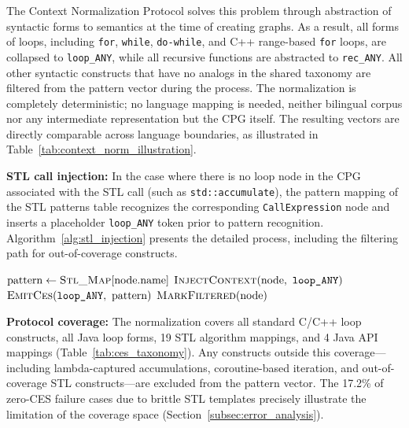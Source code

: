 The Context Normalization Protocol solves this problem through abstraction of syntactic forms to semantics at the time of creating graphs. As a result, all forms of loops, including \texttt{for}, \texttt{while}, \texttt{do-while}, and C++ range-based \texttt{for} loops, are collapsed to \texttt{loop\_ANY}, while all recursive functions are abstracted to \texttt{rec\_ANY}. All other syntactic constructs that have no analogs in the shared taxonomy are filtered from the pattern vector during the process. The normalization is completely deterministic; no language mapping is needed, neither bilingual corpus nor any intermediate representation but the CPG itself. The resulting vectors are directly comparable across language boundaries, as illustrated in Table~\ref{tab:context_norm_illustration}.

\textbf{STL call injection:} In the case where there is no loop node in the CPG associated with the STL call (such as \texttt{std::accumulate}), the pattern mapping of the STL patterns table recognizes the corresponding \texttt{CallExpression} node and inserts a placeholder \texttt{loop\_ANY} token prior to pattern recognition. Algorithm~\ref{alg:stl_injection} presents the detailed process, including the filtering path for out-of-coverage constructs.

\begin{algorithm}[t]
\caption{STL Call Injection Protocol}
\label{alg:stl_injection}
\begin{algorithmic}[1]
                \State $\text{pattern} \leftarrow \textsc{Stl\_Map}[\text{node.name}]$
                \State $\textsc{InjectContext}(\text{node},\ \texttt{loop\_ANY})$
                \State $\textsc{EmitCes}(\texttt{loop\_ANY},\ \text{pattern})$
            \Else
                \State $\textsc{MarkFiltered}(\text{node})$
            \EndIf
        \EndIf
    \EndFor
\end{algorithmic}
\end{algorithm}

\textbf{Protocol coverage:} The normalization covers all standard C/C++ loop constructs, all Java loop forms, 19 STL algorithm mappings, and 4 Java API mappings (Table~\ref{tab:ces_taxonomy}). Any constructs outside this coverage---including lambda-captured accumulations, coroutine-based iteration, and out-of-coverage STL constructs---are excluded from the pattern vector. The 17.2\% of zero-CES failure cases due to brittle STL templates precisely illustrate the limitation of the coverage space (Section~\ref{subsec:error_analysis}).

